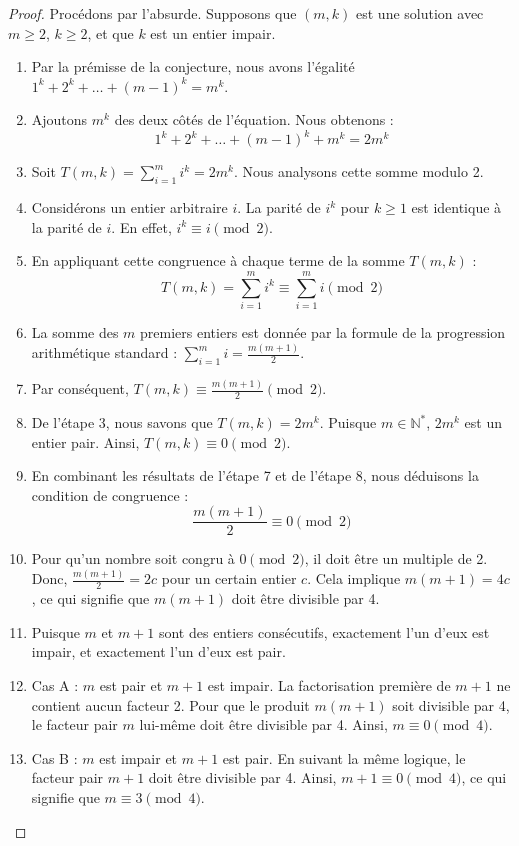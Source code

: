 \documentclass[11pt,a4paper]{article}
\begin{document}
\begin{proof}
Procédons par l'absurde. Supposons que $(m, k)$ est une solution avec $m \ge 2$, $k \ge 2$, et que $k$ est un entier impair.
\begin{enumerate}
    \item Par la prémisse de la conjecture, nous avons l'égalité $1^k + 2^k + \dots + (m-1)^k = m^k$.
    \item Ajoutons $m^k$ des deux côtés de l'équation. Nous obtenons :
    $$1^k + 2^k + \dots + (m-1)^k + m^k = 2m^k$$
    \item Soit $T(m, k) = \sum_{i=1}^{m} i^k = 2m^k$. Nous analysons cette somme modulo 2.
    \item Considérons un entier arbitraire $i$. La parité de $i^k$ pour $k \ge 1$ est identique à la parité de $i$. En effet, $i^k \equiv i \pmod 2$.
    \item En appliquant cette congruence à chaque terme de la somme $T(m, k)$ :
    $$T(m, k) = \sum_{i=1}^{m} i^k \equiv \sum_{i=1}^{m} i \pmod 2$$
    \item La somme des $m$ premiers entiers est donnée par la formule de la progression arithmétique standard : $\sum_{i=1}^{m} i = \frac{m(m+1)}{2}$.
    \item Par conséquent, $T(m, k) \equiv \frac{m(m+1)}{2} \pmod 2$.
    \item De l'étape 3, nous savons que $T(m, k) = 2m^k$. Puisque $m \in \mathbb{N}^*$, $2m^k$ est un entier pair. Ainsi, $T(m, k) \equiv 0 \pmod 2$.
    \item En combinant les résultats de l'étape 7 et de l'étape 8, nous déduisons la condition de congruence :
    $$\frac{m(m+1)}{2} \equiv 0 \pmod 2$$
    \item Pour qu'un nombre soit congru à $0 \pmod 2$, il doit être un multiple de 2. Donc, $\frac{m(m+1)}{2} = 2c$ pour un certain entier $c$. Cela implique $m(m+1) = 4c$, ce qui signifie que $m(m+1)$ doit être divisible par 4.
    \item Puisque $m$ et $m+1$ sont des entiers consécutifs, exactement l'un d'eux est impair, et exactement l'un d'eux est pair.
    \item Cas A : $m$ est pair et $m+1$ est impair. La factorisation première de $m+1$ ne contient aucun facteur 2. Pour que le produit $m(m+1)$ soit divisible par 4, le facteur pair $m$ lui-même doit être divisible par 4. Ainsi, $m \equiv 0 \pmod 4$.
    \item Cas B : $m$ est impair et $m+1$ est pair. En suivant la même logique, le facteur pair $m+1$ doit être divisible par 4. Ainsi, $m+1 \equiv 0 \pmod 4$, ce qui signifie que $m \equiv 3 \pmod 4$.

\end{enumerate}
\end{proof}
\end{document}

